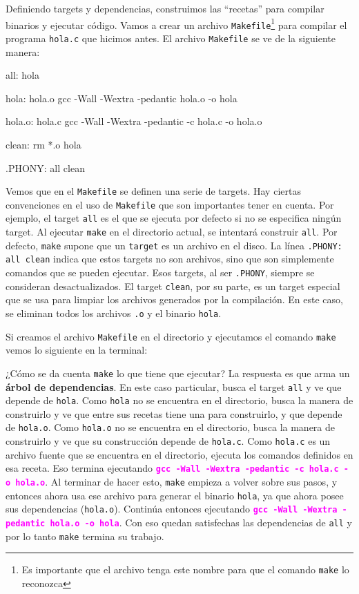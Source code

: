 \documentclass[]{scrartcl}
\newcommand{\hl}[1]{\textcolor{magenta}{\textbf{\texttt{#1}}}}
\begin{document}
Definiendo targets y dependencias, construimos las ``recetas'' para compilar binarios y ejecutar código. Vamos a crear un archivo \texttt{Makefile}\footnote{Es importante que el archivo tenga este nombre para que el comando \texttt{make} lo reconozca} para compilar el programa \texttt{hola.c} que hicimos antes. El archivo \texttt{Makefile} se ve de la siguiente manera:

\begin{bashbox}[minted language=make]
  all: hola
  
  hola: hola.o
  	gcc -Wall -Wextra -pedantic hola.o -o hola
  
  hola.o: hola.c
  	gcc -Wall -Wextra -pedantic -c hola.c -o hola.o
  
  clean:
  	rm *.o hola

  .PHONY: all clean
\end{bashbox}

Vemos que en el \texttt{Makefile} se definen una serie de targets. Hay ciertas convenciones en el uso de \texttt{Makefile} que son importantes tener en cuenta. Por ejemplo, el target \texttt{all} es el que se ejecuta por defecto si no se especifica ningún target. Al ejecutar \texttt{make} en el directorio actual, se intentará construir \texttt{all}. Por defecto, \texttt{make} supone que un \texttt{target} es un archivo en el disco. La línea \texttt{.PHONY: all clean} indica que estos targets no son archivos, sino que son simplemente comandos que se pueden ejecutar. Esos targets, al ser \texttt{.PHONY}, siempre se consideran desactualizados.
El target \texttt{clean}, por su parte, es un target especial que se usa para limpiar los archivos generados por la compilación. En este caso, se eliminan todos los archivos \texttt{.o} y el binario \texttt{hola}.

Si creamos el archivo \texttt{Makefile} en el directorio y ejecutamos el comando \texttt{make} vemos lo siguiente en la terminal:


¿Cómo se da cuenta \texttt{make} lo que tiene que ejecutar? La respuesta es que arma un \textbf{árbol de dependencias}. En este caso particular, busca el target \texttt{all} y ve que depende de \texttt{hola}. Como \texttt{hola} no se encuentra en el directorio, busca la manera de construirlo y ve que entre sus recetas tiene una para construirlo, y que depende de \texttt{hola.o}. Como \texttt{hola.o} no se encuentra en el directorio, busca la manera de construirlo y ve que su construcción depende de \texttt{hola.c}. Como \texttt{hola.c} es un archivo fuente que se encuentra en el directorio, ejecuta los comandos definidos en esa receta. Eso termina ejecutando \hl{gcc -Wall -Wextra -pedantic -c hola.c -o hola.o}. Al terminar de hacer esto, \texttt{make} empieza a volver sobre sus pasos, y entonces ahora usa ese archivo para generar el binario \texttt{hola}, ya que ahora posee sus dependencias (\texttt{hola.o}). Continúa entonces ejecutando \hl{gcc -Wall -Wextra -pedantic hola.o -o hola}. Con eso quedan satisfechas las dependencias de \texttt{all} y por lo tanto \texttt{make} termina su trabajo.
\end{document}
